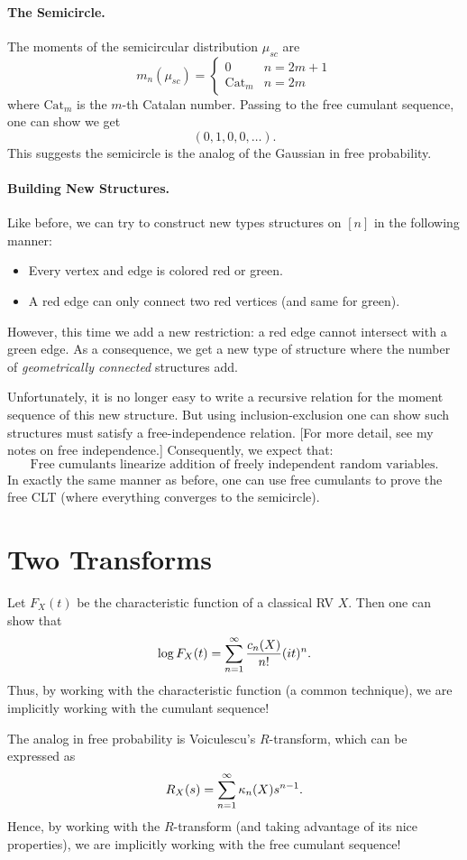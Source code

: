 \paragraph{The Semicircle.} The moments of the semicircular distribution $\mu_{sc}$ are
\[
    m_n\left(\mu_{sc}\right) =
    \begin{cases}
        0            & n = 2m + 1 \\
        \text{Cat}_m & n = 2m
    \end{cases}
\]
where $\text{Cat}_m$ is the $m$-th Catalan number. Passing to the free cumulant sequence, one can show we get
\[
    (0, 1, 0, 0, \dots).
\]
This suggests the semicircle is the analog of the Gaussian in free probability.

\paragraph{Building New Structures.} Like before, we can try to construct new types structures on $[n]$ in the following manner:
\begin{itemize}
    \item Every vertex and edge is colored red or green.
    \item A red edge can only connect two red vertices (and same for green).
\end{itemize}
However, this time we add a new restriction: a red edge cannot intersect with a green edge. As a consequence, we get a new type of structure where the number of \textit{geometrically connected} structures add.

Unfortunately, it is no longer easy to write a recursive relation for the moment sequence of this new structure. But using inclusion-exclusion one can show such structures must satisfy a free-independence relation. [For more detail, see my notes on free independence.] Consequently, we expect that:
\[
    \boxed{\text{Free cumulants linearize addition of freely independent random variables.}}
\]
In exactly the same manner as before, one can use free cumulants to prove the free CLT (where everything converges to the semicircle).

\section*{Two Transforms}
Let $F_X(t)$ be the characteristic function of a classical RV $X$. Then one can show that
\[
    \log F_X(t) = \sum_{n=1}^\infty \frac{c_n(X)}{n!}(it)^n.
\]
Thus, by working with the characteristic function (a common technique), we are implicitly working with the cumulant sequence!

The analog in free probability is Voiculescu's $R$-transform, which can be expressed as
\[
    R_X(s) = \sum_{n = 1}^\infty \kappa_n(X)s^{n-1}.
\]
Hence, by working with the $R$-transform (and taking advantage of its nice properties), we are implicitly working with the free cumulant sequence!


